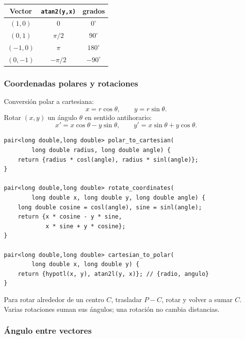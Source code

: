 \begin{center}
\begin{tabular}{ccc}
Vector & \texttt{atan2(y,x)} & grados \\
\hline
$(1,0)$ & $0$ & $0^\circ$ \\
$(0,1)$ & $\pi/2$ & $90^\circ$ \\
$(-1,0)$ & $\pi$ & $180^\circ$ \\
$(0,-1)$ & $-\pi/2$ & $-90^\circ$ \\
\end{tabular}
\end{center}


\subsubsection{Coordenadas polares y rotaciones}

Conversi\'on polar a cartesiana:
\[
x=r\cos\theta,\qquad y=r\sin\theta.
\]
Rotar $(x,y)$ un \'angulo $\theta$ en sentido antihorario:
\[
x'=x\cos\theta-y\sin\theta,\qquad
y'=x\sin\theta+y\cos\theta.
\]

\begin{lstlisting}[style=cpp]
pair<long double,long double> polar_to_cartesian(
        long double radius, long double angle) {
    return {radius * cosl(angle), radius * sinl(angle)};
}

pair<long double,long double> rotate_coordinates(
        long double x, long double y, long double angle) {
    long double cosine = cosl(angle), sine = sinl(angle);
    return {x * cosine - y * sine,
            x * sine + y * cosine};
}

pair<long double,long double> cartesian_to_polar(
        long double x, long double y) {
    return {hypotl(x, y), atan2l(y, x)}; // {radio, angulo}
}
\end{lstlisting}

Para rotar alrededor de un centro $C$, trasladar $P-C$, rotar y volver a sumar
$C$. Varias rotaciones suman sus \'angulos; una rotaci\'on no cambia distancias.

\subsubsection{\'Angulo entre vectores}


